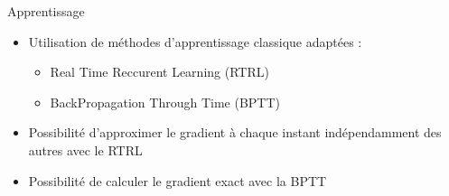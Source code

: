 \begin{frame}{Apprentissage}
    \begin{itemize}
        \item Utilisation de méthodes d'apprentissage classique adaptées :
            \begin{itemize}
                \item Real Time Reccurent Learning (RTRL) \cite{Robinson87}
                \item BackPropagation Through Time (BPTT) \cite{Williams95}
            \end{itemize}
        \item Possibilité d'approximer le gradient à chaque instant indépendamment des autres avec le RTRL
        \item Possibilité de calculer le gradient exact avec la BPTT \cite{Graves05b}
    \end{itemize}
\end{frame}